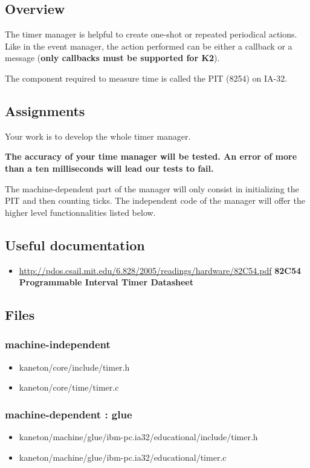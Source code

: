 \subsection*{Overview}

The timer manager is helpful to create one-shot or repeated
periodical actions. Like in the event manager, the action
performed can be either a callback or a message (\textbf{only
  callbacks must be supported for K2}).

The component required to measure time is called the PIT (8254) on
IA-32.

\subsection*{Assignments}

Your work is to develop the whole timer manager.

\textbf{The accuracy of your time manager will be tested. An error
  of more than a ten milliseconds will lead our tests to fail.}

The machine-dependent part of the manager will only consist in
initializing the PIT and then counting ticks. The independent code
of the manager will offer the higher level functionnalities listed
below.

\subsection*{Useful documentation}

\begin{itemize}
  \item \url{http://pdos.csail.mit.edu/6.828/2005/readings/hardware/82C54.pdf}
	    {\textbf{82C54 Programmable Interval Timer Datasheet}}
\end{itemize}

\subsection*{Files}
\subsubsection{\color{filerefcolor} machine-independent}
\begin{itemize}
\item kaneton/core/include/timer.h
\item kaneton/core/time/timer.c
\end{itemize}

\subsubsection{\color{filerefcolor} machine-dependent : glue}
\begin{itemize}
\item kaneton/machine/glue/ibm-pc.ia32/educational/include/timer.h
\item kaneton/machine/glue/ibm-pc.ia32/educational/timer.c
\end{itemize}

